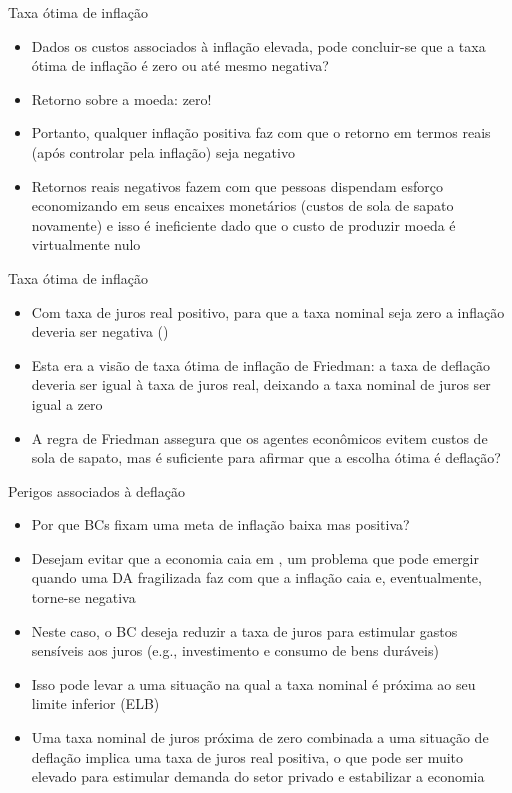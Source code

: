 \documentclass[10pt]{beamer}
\begin{document}
\begin{frame}
    {Taxa ótima de inflação}
    \begin{itemize}
        \item Dados os custos associados à inflação elevada, pode concluir-se que a taxa ótima de inflação é zero ou até mesmo negativa?\bigskip
        \item Retorno sobre a moeda: zero!\bigskip
        \item Portanto, qualquer inflação positiva faz com que o retorno em termos reais (após controlar pela inflação) seja negativo\bigskip
        \item Retornos reais negativos fazem com que pessoas dispendam esforço economizando em seus encaixes monetários (custos de sola de sapato novamente) e isso é ineficiente dado que o custo de produzir moeda é virtualmente nulo
    \end{itemize}
\end{frame}

\begin{frame}
    {Taxa ótima de inflação}
    \begin{itemize}
        \item Com taxa de juros real positivo, para que a taxa nominal seja zero a inflação deveria ser negativa ()\bigskip
        \item Esta era a visão de taxa ótima de inflação de Friedman: a taxa de deflação deveria ser igual à taxa de juros real, deixando a taxa nominal de juros ser igual a zero\bigskip
        \item A regra de Friedman assegura que os agentes econômicos evitem custos de sola de sapato, mas é suficiente para afirmar que a escolha ótima é deflação?
    \end{itemize}
\end{frame}

\begin{frame}
    {Perigos associados à deflação}
    \begin{itemize}
        \item Por que BCs fixam uma meta de inflação baixa mas positiva?\bigskip
        \item Desejam evitar que a economia caia em , um problema que pode emergir quando uma DA fragilizada faz com que a inflação caia e, eventualmente, torne-se negativa\bigskip
        \item Neste caso, o BC deseja reduzir a taxa de juros para estimular gastos sensíveis aos juros (e.g., investimento e consumo de bens duráveis)\bigskip
        \item Isso pode levar a uma situação na qual a taxa nominal é próxima ao seu limite inferior (ELB)\bigskip
        \item Uma taxa nominal de juros próxima de zero combinada a uma situação de deflação implica uma taxa de juros real positiva, o que pode ser muito elevado para estimular demanda do setor privado e estabilizar a economia
    \end{itemize}
\end{frame}
\end{document}
